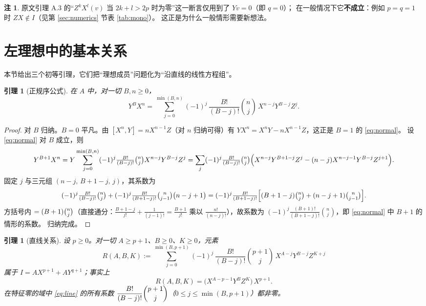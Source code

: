 \documentclass[11pt,UTF8]{ctexart}
\newtheorem{lemma}[theorem]{引理}
\theoremstyle{definition}
\newtheorem{remark}[theorem]{注}
\begin{document}
\begin{remark}
原文引理 A.3 的“$Z^kX^l(v)$ 当 $2k+l>2p$ 时为零”这一断言仅用到了 $Yv=0$（即 $q=0$）；
在一般情况下它\textbf{不成立}：例如 $p=q=1$ 时 $ZX\notin I$（见第 \ref{sec:numerics} 节表 \ref{tab:mono}）。
这正是为什么一般情形需要新想法。
\end{remark}

\section{左理想中的基本关系}\label{sec:relations}

本节给出三个初等引理，它们把“理想成员”问题化为“沿直线的线性方程组”。

\begin{lemma}[正规序公式]\label{lem:normal}
在 $A$ 中，对一切 $B,n\ge0$，
\begin{equation}\label{eq:normal}
Y^{B}X^{n}=\sum_{j=0}^{\min(B,n)}(-1)^{j}\,\frac{B!}{(B-j)!}\binom{n}{j}\,X^{n-j}Y^{B-j}Z^{j}.
\end{equation}
\end{lemma}

\begin{proof}
对 $B$ 归纳。$B=0$ 平凡。由 $[X^n,Y]=nX^{n-1}Z$（对 $n$ 归纳可得）有
$YX^{n}=X^{n}Y-nX^{n-1}Z$，这正是 $B=1$ 的 \eqref{eq:normal}。
设 \eqref{eq:normal} 对 $B$ 成立，则
\[
Y^{B+1}X^{n}=Y\sum_{j=0}^{\min(B,n)}(-1)^{j}\tfrac{B!}{(B-j)!}\tbinom{n}{j}X^{n-j}Y^{B-j}Z^{j}
=\sum_{j}(-1)^{j}\tfrac{B!}{(B-j)!}\tbinom{n}{j}
\Bigl(X^{n-j}Y^{B+1-j}Z^{j}-(n-j)X^{n-j-1}Y^{B-j}Z^{j+1}\Bigr).
\]
固定 $j$ 与三元组 $(n-j,\,B+1-j,\,j)$，其系数为
\[
(-1)^{j}\tfrac{B!}{(B-j)!}\tbinom{n}{j}+(-1)^{j}\tfrac{B!}{(B+1-j)!}\tbinom{n}{j-1}\bigl(n-j+1\bigr)
=(-1)^{j}\tfrac{B!}{(B+1-j)!}\Bigl[(B+1-j)\tbinom{n}{j}+(n-j+1)\tbinom{n}{j-1}\Bigr].
\]
方括号内 $=(B+1)\tbinom{n}{j}$（直接通分：$\frac{B+1-j}{j!}+\frac{1}{(j-1)!}=\frac{B+1}{j!}$ 乘以
$\frac{n!}{(n-j)!}$），故系数为
$(-1)^{j}\frac{(B+1)!}{(B+1-j)!}\binom{n}{j}$，即 \eqref{eq:normal} 中 $B+1$ 的情形的系数。
归纳完成。
\end{proof}

\begin{lemma}[直线关系]\label{lem:line}
设 $p\ge0$。对一切 $A\ge p+1$、$B\ge0$、$K\ge0$，元素
\begin{equation}\label{eq:line}
R(A,B,K):=\sum_{j=0}^{\min(B,p+1)}(-1)^{j}\,\frac{B!}{(B-j)!}\binom{p+1}{j}\,X^{A-j}Y^{B-j}Z^{K+j}
\end{equation}
属于 $I=AX^{p+1}+AY^{q+1}$；事实上
\begin{equation}\label{eq:line-exact}
R(A,B,K)=\bigl(X^{A-p-1}Y^{B}Z^{K}\bigr)\,X^{p+1}.
\end{equation}
在特征零的域中 \eqref{eq:line} 的所有系数 $\dfrac{B!}{(B-j)!}\dbinom{p+1}{j}$（$0\le j\le\min(B,p+1)$）都非零。
\end{lemma}
\end{document}
